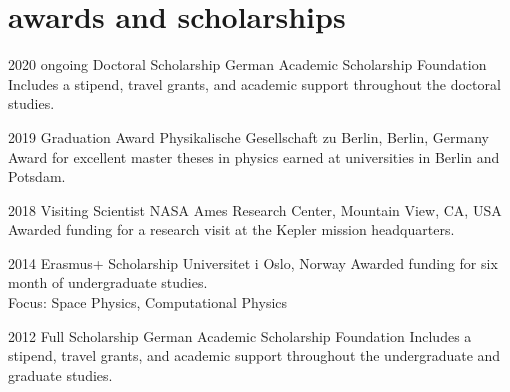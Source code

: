 \documentclass[]{k-cv} %
\begin{document}
%

\section{awards and scholarships}

\begin{entrylist}
\entry
{2020 \to ongoing}
{Doctoral Scholarship}
{German Academic Scholarship Foundation}
{Includes a stipend, travel grants, and academic support throughout the doctoral studies.}

\entry
{2019}
{Graduation Award}
{Physikalische Gesellschaft zu Berlin, Berlin, Germany}
{Award for excellent master theses in physics earned at universities in Berlin and Potsdam.}


\entry
{2018}
{Visiting Scientist}
{NASA Ames Research Center, Mountain View, CA, USA}
{Awarded funding for a research visit at the Kepler mission headquarters.}


\entry
{2014}
{Erasmus+ Scholarship}
{Universitet i Oslo, Norway}
{Awarded funding for six month of undergraduate studies.\\
Focus: Space Physics, Computational Physics}

\entry
{2012 }
{Full Scholarship}
{German Academic Scholarship Foundation}
{Includes a stipend, travel grants, and academic support throughout the undergraduate and graduate studies.}

\end{entrylist}





\end{document}
